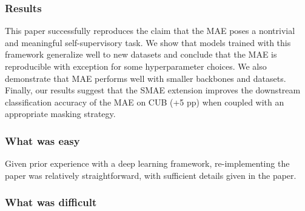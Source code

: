 \subsubsection*{Results}


This paper successfully reproduces the claim that the MAE poses a nontrivial and meaningful self-supervisory task. We show that models trained with this framework generalize well to new datasets and conclude that the MAE is reproducible with exception for some hyperparameter choices. We also demonstrate that MAE performs well with smaller backbones and datasets. Finally, our results suggest that the SMAE extension improves the downstream classification accuracy of the MAE on CUB (+5 pp) when coupled with an appropriate masking strategy.

\subsubsection*{What was easy}


Given prior experience with a deep learning framework, re-implementing the paper was relatively straightforward, with sufficient details given in the paper.



\subsubsection*{What was difficult}


